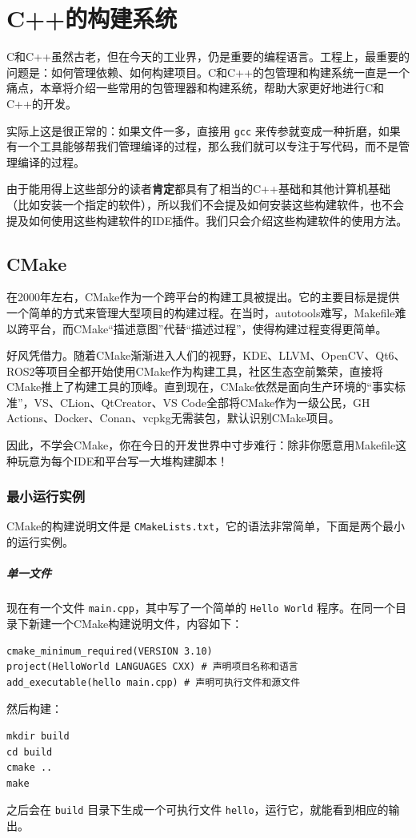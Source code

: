 \chapter{C++的构建系统}

C和C++虽然古老，但在今天的工业界，仍是重要的编程语言。工程上，最重要的问题是：如何管理依赖、如何构建项目。C和C++的包管理和构建系统一直是一个痛点，本章将介绍一些常用的包管理器和构建系统，帮助大家更好地进行C和C++的开发。

实际上这是很正常的：如果文件一多，直接用 \verb|gcc| 来传参就变成一种折磨，如果有一个工具能够帮我们管理编译的过程，那么我们就可以专注于写代码，而不是管理编译的过程。

由于能用得上这些部分的读者\textbf{肯定}都具有了相当的C++基础和其他计算机基础（比如安装一个指定的软件），所以我们不会提及如何安装这些构建软件，也不会提及如何使用这些构建软件的IDE插件。我们只会介绍这些构建软件的使用方法。

\section{CMake}

在2000年左右，CMake作为一个跨平台的构建工具被提出。它的主要目标是提供一个简单的方式来管理大型项目的构建过程。在当时，autotools难写，Makefile难以跨平台，而CMake“描述意图”代替“描述过程”，使得构建过程变得更简单。

好风凭借力。随着CMake渐渐进入人们的视野，KDE、LLVM、OpenCV、Qt6、ROS2等项目全都开始使用CMake作为构建工具，社区生态空前繁荣，直接将CMake推上了构建工具的顶峰。直到现在，CMake依然是面向生产环境的“事实标准”，VS、CLion、QtCreator、VS Code全部将CMake作为一级公民，GH Actions、Docker、Conan、vcpkg无需装包，默认识别CMake项目。

因此，不学会CMake，你在今日的开发世界中寸步难行：除非你愿意用Makefile这种玩意为每个IDE和平台写一大堆构建脚本！

\subsection{最小运行实例}

CMake的构建说明文件是 \verb|CMakeLists.txt|，它的语法非常简单，下面是两个最小的运行实例。

\paragraph{单一文件} 现在有一个文件 \verb|main.cpp|，其中写了一个简单的 \verb|Hello World| 程序。在同一个目录下新建一个CMake构建说明文件，内容如下：
\begin{verbatim}
cmake_minimum_required(VERSION 3.10)
project(HelloWorld LANGUAGES CXX) # 声明项目名称和语言
add_executable(hello main.cpp) # 声明可执行文件和源文件
\end{verbatim}
然后构建：
\begin{verbatim}
mkdir build
cd build
cmake ..
make
\end{verbatim}
之后会在 \verb|build| 目录下生成一个可执行文件 \verb|hello|，运行它，就能看到相应的输出。

